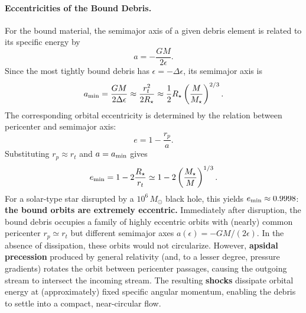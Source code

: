 \paragraph{Eccentricities of the Bound Debris.}
For the bound material, the semimajor axis of a given debris element is related to its specific energy by
\[
a = -\frac{GM}{2\epsilon}.
\]
Since the most tightly bound debris has $\epsilon = -\Delta \epsilon$, its semimajor axis is
\[
a_{\rm min} = \frac{GM}{2\Delta \epsilon} \approx \frac{r_t^2}{2R_\star} \approx \frac{1}{2}R_\star \left(\frac{M}{M_\star}\right)^{2/3}.
\]
The corresponding orbital eccentricity is determined by the relation between pericenter and semimajor axis:
\[
e = 1 - \frac{r_p}{a}.
\]
Substituting $r_p \approx r_t$ and $a = a_{\rm min}$ gives
\[
e_{\rm min} = 1 - 2\frac{R_\star}{r_t}
\simeq 1 - 2\left(\frac{M_\star}{M}\right)^{1/3}.
\]
For a solar-type star disrupted by a $10^6\,M_\odot$ black hole, this yields $e_{\rm min} \approx 0.9998$: \textbf{the bound orbits are extremely eccentric. } Immediately after disruption, the bound debris occupies a family of highly eccentric orbits with (nearly) common pericenter $r_p \simeq r_t$ but different semimajor axes $a(\epsilon) = -GM/(2\epsilon)$. In the absence of dissipation, these orbits would not circularize. However, \textbf{apsidal precession} produced by general relativity (and, to a lesser degree, pressure gradients) rotates the orbit between pericenter passages, causing the outgoing stream to intersect the incoming stream. The resulting \textbf{shocks} dissipate orbital energy at (approximately) fixed specific angular momentum, enabling the debris to settle into a compact, near-circular flow.

